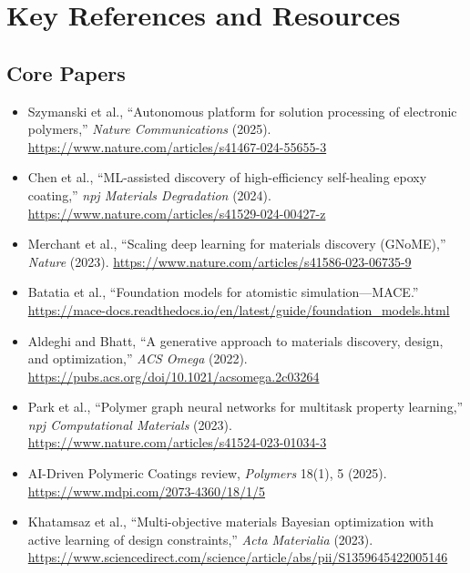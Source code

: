 \documentclass[11pt,a4paper]{article}
\begin{document}
\section{Key References and Resources}
\label{sec:references}

\subsection{Core Papers}
\begin{itemize}[nosep]
  \item Szymanski et al., ``Autonomous platform for solution processing of electronic polymers,'' \textit{Nature Communications} (2025). \url{https://www.nature.com/articles/s41467-024-55655-3}
  \item Chen et al., ``ML-assisted discovery of high-efficiency self-healing epoxy coating,'' \textit{npj Materials Degradation} (2024). \url{https://www.nature.com/articles/s41529-024-00427-z}
  \item Merchant et al., ``Scaling deep learning for materials discovery (GNoME),'' \textit{Nature} (2023). \url{https://www.nature.com/articles/s41586-023-06735-9}
  \item Batatia et al., ``Foundation models for atomistic simulation---MACE.'' \url{https://mace-docs.readthedocs.io/en/latest/guide/foundation_models.html}
  \item Aldeghi and Bhatt, ``A generative approach to materials discovery, design, and optimization,'' \textit{ACS Omega} (2022). \url{https://pubs.acs.org/doi/10.1021/acsomega.2c03264}
  \item Park et al., ``Polymer graph neural networks for multitask property learning,'' \textit{npj Computational Materials} (2023). \url{https://www.nature.com/articles/s41524-023-01034-3}
  \item AI-Driven Polymeric Coatings review, \textit{Polymers} 18(1), 5 (2025). \url{https://www.mdpi.com/2073-4360/18/1/5}
  \item Khatamsaz et al., ``Multi-objective materials Bayesian optimization with active learning of design constraints,'' \textit{Acta Materialia} (2023). \url{https://www.sciencedirect.com/science/article/abs/pii/S1359645422005146}
\end{itemize}
\end{document}
